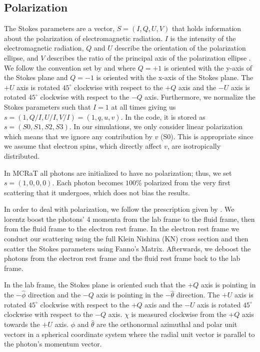 \documentclass[12pt,a4paper]{article}
\begin{document}
\subsection{Polarization}\label{pol}
The Stokes parameters are a vector, $S=(I, Q, U, V)$ that holds information about the polarization of electromagnetic radiation. $I$ is the intensity of the electromagnetic radiation, $Q$ and $U$ describe the orientation of the polarization ellipse, and $V$ describes the ratio of the principal axis of the polarization ellipse \citep{Rybiki_Lightman}. {We follow the convention set by \cite{McMaster:1961aa} and  \cite{lundman2014polarization}
where $Q=+1$ is oriented with the y-axis of the Stokes plane and $Q=-1$ is oriented with the x-axis of the Stokes plane. The $+U$ axis is rotated $45^\circ$ clockwise with respect to the $+Q$ axis and the  $-U$ axis is rotated $45^\circ$ clockwise with respect to the $-Q$ axis. }Furthermore, we normalize the Stokes parameters such that $I=1$ at all times giving us $s=(1, Q/I, U/I, V/I)=(1,q,u,v)$. In the code, it is stored as $s=(S0, S1, S2, S3)$. In our simulations, we only consider linear polarization which means that we ignore any contribution by $v$ (S0). This is appropriate since we assume that electron spins, which directly affect $v$, are isotropically distributed.

In MCRaT all photons are initialized to have no polarization; thus, we set $s=(1,0,0,0)$. Each photon becomes $100$\% polarized from the very first scattering that it undergoes, which does not bias the results. 

In order to deal with polarization, we follow the prescription given by \cite{lundman2014polarization}. We lorentz boost the photons' 4 momenta from the lab frame to the fluid frame, then from the fluid frame to the electron rest frame. In the electron rest frame we conduct our scattering using the full Klein Nishina (KN) cross section and then scatter the Stokes parameters using Fanno's Matrix. Afterwards, we deboost the photons from the electron rest frame and the fluid rest frame back to the lab frame. 

{In the lab frame, the Stokes plane is oriented such that the $+Q$ axis is pointing in the $-\hat{\phi}$ direction and the $-Q$ axis is pointing in the $-\hat{\theta}$ direction. The $+U$ axis is rotated $45^\circ$ clockwise with respect to the $+Q$ axis and the  $-U$ axis is rotated $45^\circ$ clockwise with respect to the $-Q$ axis. $\chi$ is measured clockwise from the $+Q$ axis towards the $+U$ axis. $\hat{\phi}$ and $\hat{\theta}$ are the orthonormal azimuthal and polar unit vectors in a spherical coordinate system where the radial unit vector is parallel to the photon's momentum vector.} 
\end{document}
